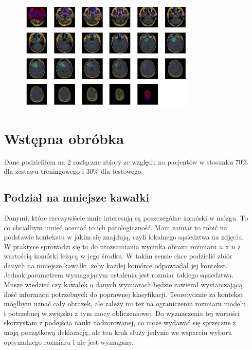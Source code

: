\begin{figure}[h!]
    \centering
    \includegraphics[width=0.8\textwidth]{images/medical_sample}
    \caption{}
    \label{fig:medical_sample}
\end{figure}

\section{Wstępna obróbka}

Dane podzieliłem na 2 rozłączne zbiory ze względu na pacjentów w stosunku 70\% dla zestawu treningowego i 30\% dla testowego.

\subsection{Podział na mniejsze kawałki}

Danymi, które rzeczywiście mnie interesują są poszczególne komórki w mózgu. To co chciałbym umieć oceniać to ich patologiczność. Mam zamiar to robić na podstawie kontekstu w jakim się znajdują, czyli lokalnego sąsiedztwa na zdjęciu. W praktyce sprowadzi się to do utożsamiania wycinka obrazu rozmiaru $n$ x $n$ z wartością komórki leżącą w jego środku. W takim sensie chce podzielić zbiór danych na mniejsze kawałki, żeby każdej komórce odpowiadał jej kontekst. Jednak parametrem wymagającym ustalenia jest rozmiar takiego sąsiedztwa. Musze wiedzieć czy kawałek o danych wymiarach będzie zawierał wystarczającą ilość informacji potrzebnych do poprawnej klasyfikacji. Teoretycznie za kontekst mógłbym uznać cały obrazek, ale zależy mi też na ograniczeniu rozmiaru modelu i potrzebnej w związku z tym mocy obliczeniowej. Do wyznaczenia tej wartości skorzystam z podejścia nauki nadzorowanej, co może wydawać się sprzeczne z moją początkową deklaracją, ale ten krok służy jedynie we wsparciu wyboru optymalnego rozmiaru i nie jest wymagany.

